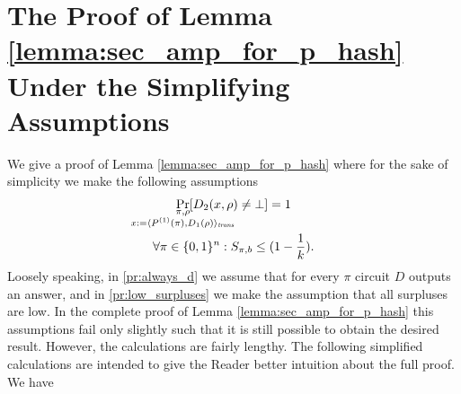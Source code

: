\section{The Proof of Lemma \ref{lemma:sec_amp_for_p_hash} Under the Simplifying Assumptions}
We give a proof of Lemma \ref{lemma:sec_amp_for_p_hash} where for the sake of simplicity we make the following assumptions
\begin{gather}
  \label{pr:always_d}
\underset{
  \mathclap{
  \substack{\pi, \rho \\ x := \langle P^{(1)}(\pi), D_1(\rho) \rangle_{\trans}}}}
{\Pr}[D_2(x,\rho) \neq \bot] = 1 \\
  \label{pr:low_surpluses}
\forall \pi \in \{0,1\}^{n} : S_{\pi, b} \leq (1 - \frac{1}{k}).
\end{gather}
Loosely speaking, in \eqref{pr:always_d} we assume that for every $\pi$ circuit $D$ outputs an answer,
and in \eqref{pr:low_surpluses} we make the assumption that all surpluses are low.
In the complete proof of Lemma \ref{lemma:sec_amp_for_p_hash} this assumptions fail only slightly such that it is still possible
to obtain the desired result. However, the calculations are fairly lengthy.
The following simplified calculations are intended to give the Reader better intuition about the full proof.
We have
